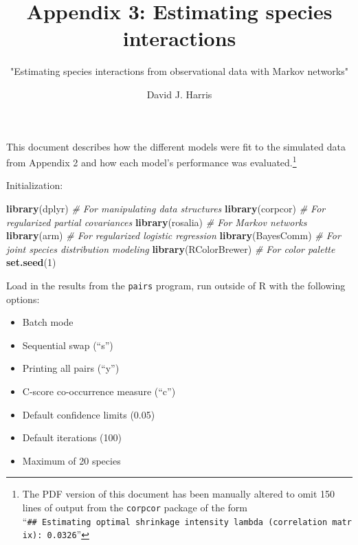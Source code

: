 \documentclass[11pt,]{article}
\title{Appendix 3: Estimating species interactions}
\subtitle{"Estimating species interactions from observational data with Markov
networks"}
\author{David J. Harris}
\date{}
\newenvironment{Shaded}{\begin{snugshade}}{\end{snugshade}}
\newcommand{\KeywordTok}[1]{\textcolor[rgb]{0.13,0.29,0.53}{\textbf{{#1}}}}
\newcommand{\DecValTok}[1]{\textcolor[rgb]{0.00,0.00,0.81}{{#1}}}
\newcommand{\CommentTok}[1]{\textcolor[rgb]{0.56,0.35,0.01}{\textit{{#1}}}}
\newcommand{\NormalTok}[1]{{#1}}
\let\rmarkdownfootnote\footnote%
\def\footnote{\protect\rmarkdownfootnote}
\begin{document}
\maketitle


This document describes how the different models were fit to the
simulated data from Appendix 2 and how each model's performance was
evaluated.\footnote{The PDF version of this document has been manually
  altered to omit 150 lines of output from the \texttt{corpcor} package
  of the form
  ``\texttt{\#\#\ Estimating\ optimal\ shrinkage\ intensity\ lambda\ (correlation\ matrix):\ 0.0326}''}

Initialization:

\begin{Shaded}
\begin{Highlighting}[]
\KeywordTok{library}\NormalTok{(dplyr)        }\CommentTok{# For manipulating data structures}
\KeywordTok{library}\NormalTok{(corpcor)      }\CommentTok{# For regularized partial covariances}
\KeywordTok{library}\NormalTok{(rosalia)      }\CommentTok{# For Markov networks}
\KeywordTok{library}\NormalTok{(arm)          }\CommentTok{# For regularized logistic regression}
\KeywordTok{library}\NormalTok{(BayesComm)    }\CommentTok{# For joint species distribution modeling}
\KeywordTok{library}\NormalTok{(RColorBrewer) }\CommentTok{# For color palette}
\KeywordTok{set.seed}\NormalTok{(}\DecValTok{1}\NormalTok{)}
\end{Highlighting}
\end{Shaded}

Load in the results from the \texttt{pairs} program, run outside of R
with the following options:

\begin{itemize}
\itemsep1pt\parskip0pt
\item
  Batch mode
\item
  Sequential swap (``s'')
\item
  Printing all pairs (``y'')
\item
  C-score co-occurrence measure (``c'')
\item
  Default confidence limits (0.05)
\item
  Default iterations (100)
\item
  Maximum of 20 species
\end{itemize}
\end{document}
